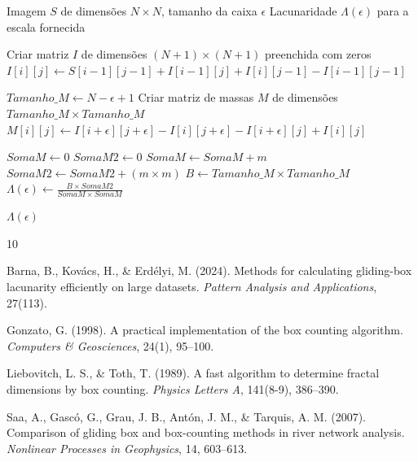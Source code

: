\documentclass[12pt]{article}
\begin{document}
\begin{algorithm}[htpb]
\caption{Gliding Box Otimizado (Método da Imagem Integral)}
\label{alg:gliding_box}
\begin{algorithmic}[1]
    \Require Imagem $S$ de dimensões $N \times N$, tamanho da caixa $\epsilon$
    \Ensure Lacunaridade $\Lambda(\epsilon)$ para a escala fornecida
    
    \Statex {}
    \State Criar matriz $I$ de dimensões $(N+1) \times (N+1)$ preenchida com zeros
            \State $I[i][j] \gets S[i-1][j-1] + I[i-1][j] + I[i][j-1] - I[i-1][j-1]$
        \EndFor
    \EndFor
    
    \Statex {}
    \State $Tamanho\_M \gets N - \epsilon + 1$
    \State Criar matriz de massas $M$ de dimensões $Tamanho\_M \times Tamanho\_M$
            \State {}
            \State $M[i][j] \gets I[i+\epsilon][j+\epsilon] - I[i][j+\epsilon] - I[i+\epsilon][j] + I[i][j]$
        \EndFor
    \EndFor
    
    \Statex {}
    \State $SomaM \gets 0$
    \State $SomaM2 \gets 0$
        \State $SomaM \gets SomaM + m$
        \State $SomaM2 \gets SomaM2 + (m \times m)$
    \EndFor
    \State $B \gets Tamanho\_M \times Tamanho\_M$ 
    \State $\Lambda(\epsilon) \gets \frac{B \times SomaM2}{SomaM \times SomaM}$
    
    \Statex
    \State \Return $\Lambda(\epsilon)$
\end{algorithmic}
\end{algorithm}

\begin{thebibliography}{10}

Barna, B., Kovács, H., \& Erdélyi, M. (2024).
\newblock Methods for calculating gliding-box lacunarity efficiently on large datasets.
\newblock \emph{Pattern Analysis and Applications}, 27(113).

Gonzato, G. (1998).
\newblock A practical implementation of the box counting algorithm.
\newblock \emph{Computers \& Geosciences}, 24(1), 95--100.

Liebovitch, L. S., \& Toth, T. (1989).
\newblock A fast algorithm to determine fractal dimensions by box counting.
\newblock \emph{Physics Letters A}, 141(8-9), 386--390.

Saa, A., Gascó, G., Grau, J. B., Antón, J. M., \& Tarquis, A. M. (2007).
\newblock Comparison of gliding box and box-counting methods in river network analysis.
\newblock \emph{Nonlinear Processes in Geophysics}, 14, 603--613.

\end{thebibliography}
\end{document}

